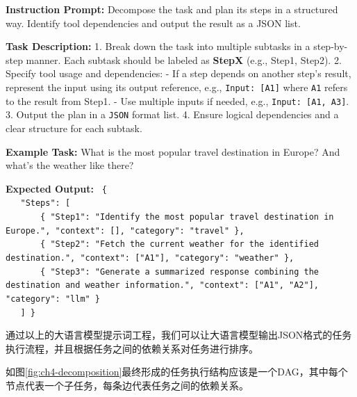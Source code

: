 \begin{center}
\begin{tcolorbox}[colback=bgcolor, colframe=black, width=0.85\textwidth, boxrule=0.5mm, 
coltitle=white, colbacktitle=titlecolor, title=Task Decomposition and Response Planning with GPT-4]


\textbf{Instruction Prompt:} Decompose the task and plan its steps in a structured way. Identify tool dependencies and output the result as a JSON list.

\textbf{Task Description:}  
1. Break down the task into multiple subtasks in a step-by-step manner. Each subtask should be labeled as \textbf{StepX} (e.g., Step1, Step2).  
2. Specify tool usage and dependencies:  
   - If a step depends on another step's result, represent the input using its output reference, e.g., \texttt{Input: [A1]} where \texttt{A1} refers to the result from Step1.  
   - Use multiple inputs if needed, e.g., \texttt{Input: [A1, A3]}.  
3. Output the plan in a \texttt{JSON} format list.  
4. Ensure logical dependencies and a clear structure for each subtask. 

\textbf{Example Task:}  
What is the most popular travel destination in Europe? And what’s the weather like there?

\textbf{Expected Output:}  
\texttt{%
\{ \\
\ \ \ "Steps": [ \\
\ \ \ \ \ \ \ \{ "Step1": "Identify the most popular travel destination in Europe.", "context": [], "category": "travel" \}, \\
\ \ \ \ \ \ \ \{ "Step2": "Fetch the current weather for the identified destination.", "context": ["A1"], "category": "weather" \}, \\
\ \ \ \ \ \ \ \{ "Step3": "Generate a summarized response combining the destination and weather information.", "context": ["A1", "A2"], "category": "llm" \} \\
\ \ \ ]
\}
}

\end{tcolorbox}
\end{center}

通过以上的大语言模型提示词工程，我们可以让大语言模型输出JSON格式的任务执行流程，并且根据任务之间的依赖关系对任务进行排序。

如图\ref{fig:ch4-decomposition}最终形成的任务执行结构应该是一个DAG，其中每个节点代表一个子任务，每条边代表任务之间的依赖关系。

